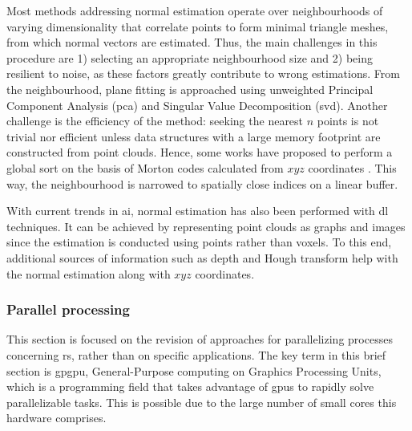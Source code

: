 Most methods addressing normal estimation operate over neighbourhoods of varying dimensionality that correlate points to form minimal triangle meshes, from which normal vectors are estimated. Thus, the main challenges in this procedure are 1) selecting an appropriate neighbourhood size and 2) being resilient to noise, as these factors greatly contribute to wrong estimations. From the neighbourhood, plane fitting is approached using unweighted Principal Component Analysis (\acrshort{pca}) and Singular Value Decomposition (\acrshort{svd}). Another challenge is the efficiency of the method: seeking the nearest $n$ points is not trivial nor efficient unless data structures with a large memory footprint are constructed from point clouds. Hence, some works have proposed to perform a global sort on the basis of Morton codes calculated from $\textit{xyz}$ coordinates \cite{jakob_optimizing_2021}. This way, the neighbourhood is narrowed to spatially close indices on a linear buffer.

With current trends in \acrshort{ai}, normal estimation has also been performed with \acrshort{dl} techniques. It can be achieved by representing point clouds as graphs \cite{lenssen_deep_2020} and images \cite{zeng_deep_2019, boulch_deep_2016} since the estimation is conducted using points rather than voxels. To this end, additional sources of information such as depth and Hough transform \cite{boulch_deep_2016} help with the normal estimation along with $\textit{xyz}$ coordinates. 

\subsubsection{Parallel processing}

This section is focused on the revision of approaches for parallelizing processes concerning \acrshort{rs}, rather than on specific applications. The key term in this brief section is \acrshort{gpgpu}, General-Purpose computing on Graphics Processing Units, which is a programming field that takes advantage of \acrshort{gpu}s to rapidly solve parallelizable tasks. This is possible due to the large number of small cores this hardware comprises. 

